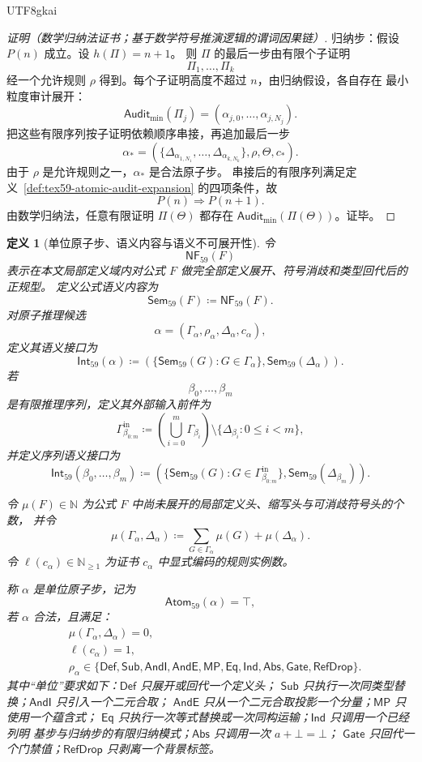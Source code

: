 \documentclass[12pt]{article}
\newtheorem{definition}{定义}[section]
\newcommand{\NN}{\mathbb{N}}
\newcommand{\DefEq}{\coloneqq}
\begin{document}
\begin{CJK*}{UTF8}{gkai}
\begin{proof}[证明（数学归纳法证书；基于数学符号推演逻辑的谓词因果链）]
归纳步：假设 \(P(n)\) 成立。设 \(h(\Pi)=n+1\)。
则 \(\Pi\) 的最后一步由有限个子证明
\[
  \Pi_1,\ldots,\Pi_k
\]
经一个允许规则 \(\rho\) 得到。每个子证明高度不超过 \(n\)，由归纳假设，各自存在
最小粒度审计展开：
\[
  \mathsf{Audit}_{\min}(\Pi_j)
  =
  (\alpha_{j,0},\ldots,\alpha_{j,N_j}).
\]
把这些有限序列按子证明依赖顺序串接，再追加最后一步
\[
  \alpha_{\ast}
  =
  (\{\Delta_{\alpha_{1,N_1}},\ldots,\Delta_{\alpha_{k,N_k}}\},
   \rho,\Theta,c_{\ast}).
\]
由于 \(\rho\) 是允许规则之一，\(\alpha_{\ast}\) 是合法原子步。
串接后的有限序列满足定义~\ref{def:tex59-atomic-audit-expansion} 的四项条件，故
\[
  P(n)\Rightarrow P(n+1).
\]
由数学归纳法，任意有限证明 \(\Pi(\Theta)\) 都存在
\(\mathsf{Audit}_{\min}(\Pi(\Theta))\)。证毕。
\end{proof}

\begin{definition}[单位原子步、语义内容与语义不可展开性]
\label{def:tex59-semantic-irreducible-atomic-step}
令
\[
  \mathsf{NF}_{59}(F)
\]
表示在本文局部定义域内对公式 \(F\) 做完全部定义展开、符号消歧和类型回代后的正规型。
定义公式语义内容为
\[
  \mathsf{Sem}_{59}(F)\DefEq \mathsf{NF}_{59}(F).
\]
对原子推理候选
\[
  \alpha=(\Gamma_{\alpha},\rho_{\alpha},\Delta_{\alpha},c_{\alpha}),
\]
定义其语义接口为
\[
  \mathsf{Int}_{59}(\alpha)
  \DefEq
  \left(
  \{\mathsf{Sem}_{59}(G):G\in\Gamma_{\alpha}\},
  \mathsf{Sem}_{59}(\Delta_{\alpha})
  \right).
\]
若
\[
  \beta_0,\ldots,\beta_m
\]
是有限推理序列，定义其外部输入前件为
\[
  \Gamma_{\beta_{0:m}}^{\mathrm{in}}
  \DefEq
  \left(\bigcup_{i=0}^{m}\Gamma_{\beta_i}\right)
  \setminus
  \{\Delta_{\beta_i}:0\le i<m\},
\]
并定义序列语义接口为
\[
  \mathsf{Int}_{59}(\beta_0,\ldots,\beta_m)
  \DefEq
  \left(
  \{\mathsf{Sem}_{59}(G):G\in\Gamma_{\beta_{0:m}}^{\mathrm{in}}\},
  \mathsf{Sem}_{59}(\Delta_{\beta_m})
  \right).
\]

令 \(\mu(F)\in\NN\) 为公式 \(F\) 中尚未展开的局部定义头、缩写头与可消歧符号头的个数，
并令
\[
  \mu(\Gamma_{\alpha},\Delta_{\alpha})
  \DefEq
  \sum_{G\in\Gamma_{\alpha}}\mu(G)+\mu(\Delta_{\alpha}).
\]
令 \(\ell(c_{\alpha})\in\NN_{\ge1}\) 为证书 \(c_{\alpha}\) 中显式编码的规则实例数。

称 \(\alpha\) 是单位原子步，记为
\[
  \mathsf{Atom}_{59}(\alpha)=\top,
\]
若 \(\alpha\) 合法，且满足：
\[
\begin{aligned}
  &\mu(\Gamma_{\alpha},\Delta_{\alpha})=0,\\
  &\ell(c_{\alpha})=1,\\
  &\rho_{\alpha}\in
  \{\mathsf{Def},\mathsf{Sub},\mathsf{AndI},\mathsf{AndE},
    \mathsf{MP},\mathsf{Eq},\mathsf{Ind},\mathsf{Abs},\mathsf{Gate},\mathsf{RefDrop}\}.
\end{aligned}
\]
其中“单位”要求如下：\(\mathsf{Def}\) 只展开或回代一个定义头；
\(\mathsf{Sub}\) 只执行一次同类型替换；\(\mathsf{AndI}\) 只引入一个二元合取；
\(\mathsf{AndE}\) 只从一个二元合取投影一个分量；\(\mathsf{MP}\) 只使用一个蕴含式；
\(\mathsf{Eq}\) 只执行一次等式替换或一次同构运输；\(\mathsf{Ind}\) 只调用一个已经列明
基步与归纳步的有限归纳模式；\(\mathsf{Abs}\) 只调用一次 \(a+\bot=\bot\)；
\(\mathsf{Gate}\) 只回代一个门禁值；\(\mathsf{RefDrop}\) 只剥离一个背景标签。


\end{definition}
\end{CJK*}
\end{document}
